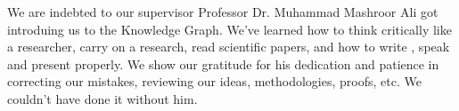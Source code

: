 
We are indebted to our supervisor Professor Dr. Muhammad Mashroor Ali got introduing us to the Knowledge Graph.
We've learned how to think critically like a researcher, carry on a research, read scientific papers, and how to write
, speak and present properly.
We show our gratitude for his dedication and patience in correcting our mistakes, reviewing our ideas, 
methodologies, proofs, etc. We couldn't have done it without him.

\endinput